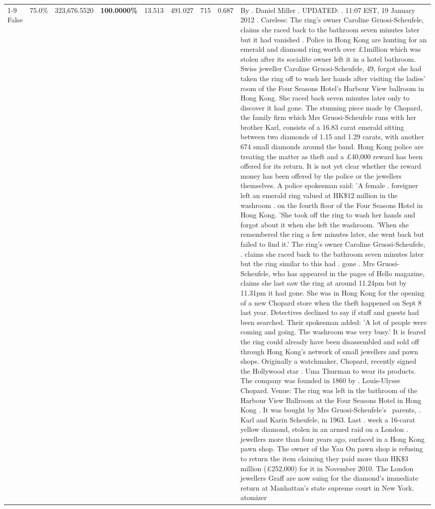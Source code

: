 \begin{table}[H]
\begin{tabular}{lllrlllll}
\cline{1-9}
False & 75.0\% & 323,676.5520 & \bfseries \color{red} 100.0000\% & 13.513 & 491.027 & 715 & 0.687 & By . Daniel Miller . UPDATED: . 11:07 EST, 19 January 2012 . Careless: The ring's owner Caroline Gruosi-Scheufele, claims she raced back to the bathroom seven minutes later but it had vanished . Police in Hong Kong are hunting for an emerald and diamond ring worth over £1million which was stolen after its socialite owner left it in a hotel bathroom. Swiss jeweller Caroline Gruosi-Scheufele, 49, forgot she had taken the ring off to wash her hands after visiting the ladies' room of the Four Seasons Hotel's Harbour View ballroom in Hong Kong. She raced back seven minutes later only to discover it had gone. The stunning piece made by Chopard, the family firm which Mrs Gruosi-Scheufele runs with her brother Karl, consists of a 16.83 carat emerald sitting between two diamonds of 1.15 and 1.29 carats, with another 674 small diamonds around the band. Hong Kong police are treating the matter as theft and a £40,000 reward has been offered for its return. It is not yet clear whether the reward money has been offered by the police or the jewellers themselves. A police spokesman said: 'A female . foreigner left an emerald ring valued at HK\$12 million in the washroom . on the fourth floor of the Four Seasons Hotel in Hong Kong. 'She took off the ring to wash her hands and forgot about it when she left the washroom. 'When she remembered the ring a few minutes later, she went back but failed to find it.' The ring's owner Caroline Gruosi-Scheufele, . claims she raced back to the bathroom seven minutes later but the ring similar to this had . gone . Mrs Gruosi-Scheufele, who has appeared in the pages of Hello magazine, claims she last saw the ring at around 11.24pm but by 11.31pm it had gone. She was in Hong Kong for the opening of a new Chopard store when the theft happened on Sept 8 last year. Detectives declined to say if staff and guests had been searched. Their spokesman added: 'A lot of people were coming and going. The washroom was very busy.' It is feared the ring could already have been disassembled and sold off through Hong Kong's network of small jewellers and pawn shops. Originally a watchmaker, Chopard, recently signed the Hollywood star . Uma Thurman to wear its products. The company was founded in 1860 by . Louis-Ulysse Chopard. Venue: The ring was left in the bathroom of the Harbour View Ballroom at the Four Seasons Hotel in Hong Kong . It was bought by Mrs Gruosi-Scheufele's  parents, . Karl and Karin Scheufele, in 1963. Last . week a 16-carat yellow diamond, stolen in an armed raid on a London . jewellers more than four years ago, surfaced in a Hong Kong pawn shop. The owner of the Yau On pawn shop is refusing to return the item claiming they paid more than HK\$3 million (£252,000) for it in November 2010. The London jewellers Graff are now suing for the diamond’s immediate return at Manhattan’s state supreme court in New York. atomizer \\

\end{tabular}
\end{table}
